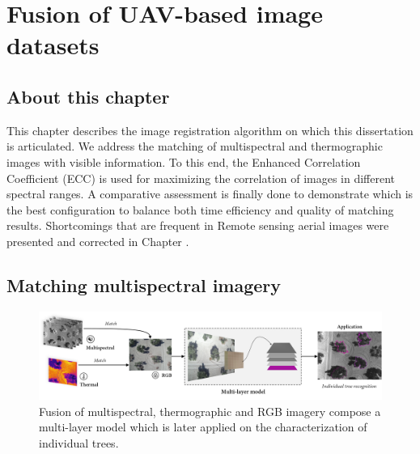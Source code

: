 \setchapterpreamble[u]{\margintoc}
\chapter{Fusion of UAV-based image datasets}
\label{sec:image_fusion}

\section*{About this chapter}

This chapter describes the image registration algorithm on which this dissertation is articulated. We address the matching of multispectral and thermographic images with visible information. To this end, the Enhanced Correlation Coefficient (ECC) is used for maximizing the correlation of images in different spectral ranges. A comparative assessment is finally done to demonstrate which is the best configuration to balance both time efficiency and quality of matching results. Shortcomings that are frequent in \gls{Remote sensing} aerial images were presented and corrected in Chapter . 

\section{Matching multispectral imagery}

\begin{figure}
    \includegraphics[width=\linewidth]{figs/image_fusion/summary_image_fusion.png}\hspace*{\fill}
    \caption{Fusion of multispectral, thermographic and RGB imagery compose a multi-layer model which is later applied on the characterization of individual trees.}
	\label{fig:image_fusion_framework}
\end{figure}

